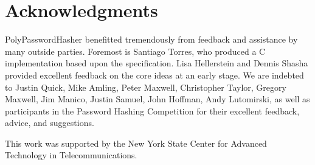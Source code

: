 \section{Acknowledgments}

PolyPasswordHasher benefitted tremendously from feedback and assistance by many 
outside parties.   Foremost is Santiago Torres, who produced a C 
implementation based upon the specification.   Lisa Hellerstein and Dennis
Shasha provided excellent feedback on the core ideas at an early stage.   
We are indebted to Justin Quick, Mike Amling, Peter Maxwell, Christopher 
Taylor, Gregory Maxwell, Jim Manico, Justin Samuel, John Hoffman, 
Andy Lutomirski, as well as participants in the Password Hashing 
Competition for their excellent feedback, advice, and suggestions.

This work was supported by the New York State Center for Advanced Technology 
in Telecommunications.
